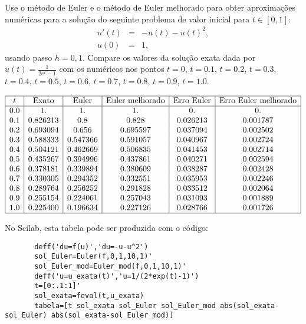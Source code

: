 \begin{exer}
Use o método de Euler e o método de Euler melhorado para obter aproximações numéricas para a solução do seguinte problema de valor inicial para $t\in[0,1]$:
\begin{eqnarray*}
 u'(t)&=&-u(t)- u(t)^2,\\
 u(0)&=&1,
\end{eqnarray*}
usando passo $h=0,1$. Compare os valores da solução exata dada por $u(t)=\frac{1}{2e^t-1}$ com os numéricos nos pontos $t=0$, $t=0.1$, $t=0.2$, $t=0.3$, $t=0.4$, $t=0.5$, $t=0.6$, $t=0.7$, $t=0.8$, $t=0.9$, $t=1.0$.
\end{exer}
\begin{resp}

 $$\begin{array}{|c|c|c|c|c|c|}
\hline
t &  \text{Exato} & \text{Euler} & \text{Euler melhorado} & \text{Erro Euler} & \text{Erro Euler melhorado}\\
\hline
0.0&    1.          &1.          &1.          &0.          &0.       \\
0.1&    0.826213    &0.8         &0.828       &0.026213    &0.001787\\
0.2&    0.693094    &0.656       &0.695597    &0.037094    &0.002502  \\
0.3&    0.588333    &0.547366    &0.591057    &0.040967    &0.002724  \\
0.4&    0.504121    &0.462669    &0.506835    &0.041453    &0.002714  \\
0.5&    0.435267    &0.394996    &0.437861    &0.040271    &0.002594  \\
0.6&    0.378181    &0.339894    &0.380609    &0.038287    &0.002428  \\
0.7&    0.330305    &0.294352    &0.332551    &0.035953    &0.002246  \\
0.8&    0.289764    &0.256252    &0.291828    &0.033512    &0.002064  \\
0.9&    0.255154    &0.224061    &0.257043    &0.031093    &0.001889  \\
1.0&    0.225400    &0.196634    &0.227126    &0.028766    &0.001726\\

\hline
\end{array}
$$

\ifisscilab
      No Scilab, esta tabela pode ser produzida com o código:
      \begin{verbatim}
       deff('du=f(u)','du=-u-u^2')
       sol_Euler=Euler(f,0,1,10,1)'
       sol_Euler_mod=Euler_mod(f,0,1,10,1)'
       deff('u=u_exata(t)','u=1/(2*exp(t)-1)')
       t=[0:.1:1]'
       sol_exata=feval(t,u_exata)
       tabela=[t sol_exata sol_Euler sol_Euler_mod abs(sol_exata-sol_Euler) abs(sol_exata-sol_Euler_mod)]
      \end{verbatim}

    \fi

\end{resp}






